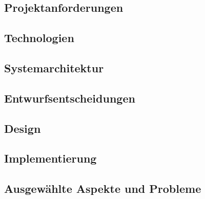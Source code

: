 \documentclass[12pt,a4paper,titlepage,listof=totoc,bibliography=totoc,chapteratlists=0pt]{scrreprt}
\begin{document}
\begin{spacing}{1}
    \chapter{Projektanforderungen}
\end{spacing}


\begin{spacing}{1}
    \chapter{Technologien}\label{chapter:technologien}
\end{spacing}


\begin{spacing}{1}
    \chapter{Systemarchitektur}\label{chapter:system-architecture}
\end{spacing}


\begin{spacing}{1}
    \chapter{Entwurfsentscheidungen}\label{chapter:Entwurfsentscheidungen}
\end{spacing}


\begin{spacing}{1}
    \chapter{Design}
\end{spacing}


\begin{spacing}{1}
    \chapter{Implementierung}\label{chapter:implementation}
\end{spacing}


\begin{spacing}{1}
    \chapter{Ausgewählte Aspekte und Probleme}\label{chapter:aspekte-probleme}
\end{spacing}

\end{document}
